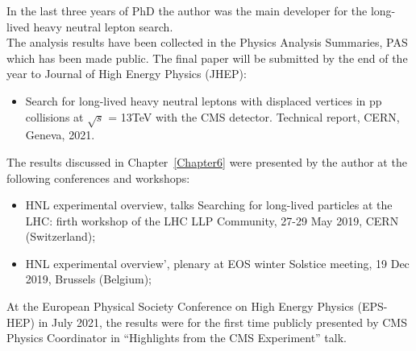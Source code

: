 In the last three years of PhD the author was the main developer for the
long-lived heavy neutral lepton search. \\
The analysis results have been collected in the Physics Analysis
Summaries, PAS which has been made public. The final paper will be
submitted by the end of the year to Journal
of High Energy Physics (JHEP):
\begin{itemize}
\setlength\itemsep{-0.1em}
\item Search for long-lived heavy neutral leptons with displaced vertices in pp collisions at $\sqrt{s}$ =
13TeV with the CMS detector. Technical report, CERN, Geneva, 2021.
\end{itemize}

The results discussed in Chapter~\ref{Chapter6} were presented by the author at the following
conferences and workshops:

\begin{itemize}
\setlength\itemsep{-0.1em}
\item HNL experimental overview, talks Searching for long-lived
  particles at the LHC: firth workshop of the LHC LLP Community, 27-29
  May 2019, CERN (Switzerland);
\item HNL experimental overview', plenary at EOS winter Solstice
  meeting, 19 Dec 2019, Brussels (Belgium);
\end{itemize}

At the European Physical Society Conference on High Energy Physics
(EPS-HEP) in July 2021, the results were for the first time publicly
presented by CMS Physics Coordinator in ``Highlights from the CMS
Experiment'' talk.

